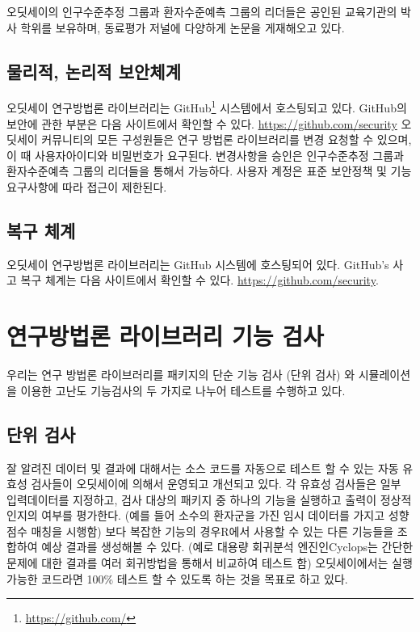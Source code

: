 \documentclass[11pt]{book}
\let\rmarkdownfootnote\footnote%
\def\footnote{\protect\rmarkdownfootnote}
\theoremstyle{definition}
\theoremstyle{definition}
\theoremstyle{definition}
\theoremstyle{remark}
\begin{document}
오딧세이의 인구수준추정 그룹과 환자수준예측 그룹의 리더들은 공인된
교육기관의 박사 학위를 보유하며, 동료평가 저널에 다양하게 논문을
게재해오고 있다.

\subsection{물리적, 논리적 보안체계}\label{--}

오딧세이 연구방법론 라이브러리는 GitHub\footnote{\url{https://github.com/}}
시스템에서 호스팅되고 있다. GitHub의 보안에 관한 부분은 다음 사이트에서
확인할 수 있다. \url{https://github.com/security} 오딧세이 커뮤니티의
모든 구성원들은 연구 방법론 라이브러리를 변경 요청할 수 있으며, 이 때
사용자아이디와 비밀번호가 요구된다. 변경사항을 승인은 인구수준추정
그룹과 환자수준예측 그룹의 리더들을 통해서 가능하다. 사용자 계정은 표준
보안정책 및 기능 요구사항에 따라 접근이 제한된다.

\subsection{복구 체계}\label{-}

오딧세이 연구방법론 라이브러리는 GitHub 시스템에 호스팅되어 있다.
GitHub's 사고 복구 체계는 다음 사이트에서 확인할 수 있다.
\url{https://github.com/security}.

\section{연구방법론 라이브러리 기능 검사}\label{---}

우리는 연구 방법론 라이브러리를 패키지의 단순 기능 검사 (단위 검사) 와
시뮬레이션을 이용한 고난도 기능검사의 두 가지로 나누어 테스트를 수행하고
있다.

\subsection{단위 검사}\label{-}

잘 알려진 데이터 및 결과에 대해서는 소스 코드를 자동으로 테스트 할 수
있는 자동 유효성 검사들이 오딧세이에 의해서 운영되고 개선되고 있다. 각
유효성 검사들은 일부 입력데이터를 지정하고, 검사 대상의 패키지 중 하나의
기능을 실행하고 출력이 정상적인지의 여부를 평가한다. (예를 들어 소수의
환자군을 가진 임시 데이터를 가지고 성향점수 매칭을 시행함) 보다 복잡한
기능의 경우R에서 사용할 수 있는 다른 기능들을 조합하여 예상 결과를
생성해볼 수 있다. (예로 대용량 회귀분석 엔진인Cyclops는 간단한 문제에
대한 결과를 여러 회귀방법을 통해서 비교하여 테스트 함) 오딧세이에서는
실행 가능한 코드라면 100\% 테스트 할 수 있도록 하는 것을 목표로 하고
있다.
\end{document}
